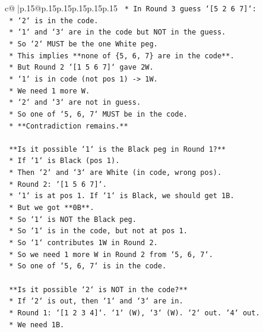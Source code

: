 \documentclass{article}
\begin{document}
{\begin{supertabular}{c@{$\;$}|p{.15\linewidth}@{}p{.15\linewidth}p{.15\linewidth}p{.15\linewidth}p{.15\linewidth}p{.15\linewidth}}
{{{\texttt{    *   In Round 3 guess `{[}5 2 6 7{]}`:} \\
\texttt{        *   `2` is in the code.} \\
\texttt{        *   `1` and `3` are in the code but NOT in the guess.} \\
\texttt{        *   So `2` MUST be the one White peg.} \\
\texttt{        *   This implies **none of \{5, 6, 7\} are in the code**.} \\
\texttt{    *   But Round 2 `{[}1 5 6 7{]}` gave 2W.} \\
\texttt{        *   `1` is in code (not pos 1) {-}> 1W.} \\
\texttt{        *   We need 1 more W.} \\
\texttt{        *   `2` and `3` are not in guess.} \\
\texttt{        *   So one of `5, 6, 7` MUST be in the code.} \\
\texttt{    *   **Contradiction remains.**} \\
\\ 
\texttt{    **Is it possible `1` is the Black peg in Round 1?**} \\
\texttt{    *   If `1` is Black (pos 1).} \\
\texttt{    *   Then `2` and `3` are White (in code, wrong pos).} \\
\texttt{    *   Round 2: `{[}1 5 6 7{]}`.} \\
\texttt{        *   `1` is at pos 1. If `1` is Black, we should get 1B.} \\
\texttt{        *   But we got **0B**.} \\
\texttt{        *   So `1` is NOT the Black peg.} \\
\texttt{    *   So `1` is in the code, but not at pos 1.} \\
\texttt{    *   So `1` contributes 1W in Round 2.} \\
\texttt{    *   So we need 1 more W in Round 2 from `5, 6, 7`.} \\
\texttt{    *   So one of `5, 6, 7` is in the code.} \\
\\ 
\texttt{    **Is it possible `2` is NOT in the code?**} \\
\texttt{    *   If `2` is out, then `1` and `3` are in.} \\
\texttt{    *   Round 1: `{[}1 2 3 4{]}`. `1` (W), `3` (W). `2` out. `4` out.} \\
\texttt{    *   We need 1B.} \\
}}}
\end{supertabular}}
\end{document}
